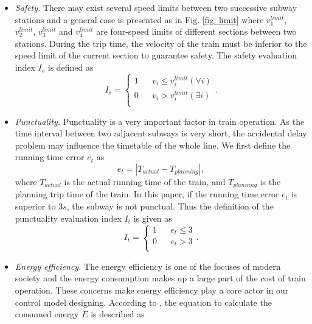 \documentclass[journal]{IEEEtran}
\begin{document}
\begin{itemize}
	\item \emph{Safety.} There may exist several speed limits between two successive subway stations and a general case is presented as in Fig. \ref{fig: limit} where \(v_1^{limit}\), \(v_2^{limit}\), \(v_3^{limit}\) and \(v_4^{limit}\) are four-speed limits of different sections between two stations. During the trip time, the velocity of the train must be inferior to the speed limit of the current section to guarantee safety. The safety evaluation index \(I_s\) is defined as 
    \begin{equation}
    I_s=\left\{
    \begin{array}{rcl}
    1 & & v_i \leq v_i^{limit}(\forall i)\\
    0 & & v_i > v_i^{limit}(\exists i) \\
    \end{array} 
    \right..
    \end{equation}
	\item \emph{Punctuality.} Punctuality is a very important factor in train operation. As the time interval between two adjacent subways is very short, the accidental delay problem may influence the timetable of the whole line. We first define the running time error \(e_{t}\) as
	\begin{equation}
	e_{t}={|T_{actual}-T_{planning}|},
	\end{equation}	
	where \(T_{actual}\) is the actual running time of the train, and \(T_{planning}\) is the planning trip time of the train. In this paper, if the running time error \(e_{t}\) is superior to \(3s\), the subway is not punctual. Thus the definition of the punctuality evaluation index \(I_t\) is given as
    \begin{equation}
	I_t=\left\{
	\begin{array}{rcl}
	1 & & e_{t} \leq 3\\
	0 & & e_{t} > 3\\
	\end{array} 
	\right..
	\end{equation}
	\item \emph{Energy efficiency.} The energy efficiency is one of the focuses of modern society and the energy consumption makes up a large part of the cost of train operation. These concerns make energy efficiency play a core actor in our control model designing. According to \cite{cheng2017intelligent}, the equation to calculate the consumed energy \(E\) is described as 
	\begin{equation}

\end{equation}
\end{itemize}
\end{document}
